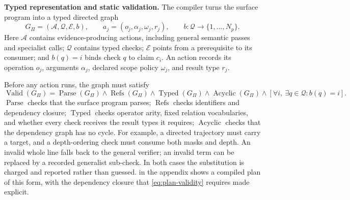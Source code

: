 \medskip\noindent\textbf{Typed representation and static validation.}\quad
\label{sec:plan-lang}%
The compiler turns the surface program into a typed directed graph
\begin{equation}
G_{\Pi}=(\mathcal{A},\mathcal{Q},\mathcal{E},b),
\qquad
a_j=(o_j,\alpha_j,\omega_j,r_j),
\qquad
b:\mathcal{Q}\rightarrow\{1,\ldots,N_p\}.
\label{eq:plan-dag}
\end{equation}
Here $\mathcal{A}$ contains evidence-producing actions, including general
semantic passes and specialist calls; $\mathcal{Q}$ contains typed checks;
$\mathcal{E}$ points from a prerequisite to its consumer; and $b(q)=i$ binds
check $q$ to claim $c_i$. An action records its operation $o_j$, arguments
$\alpha_j$, declared scope policy $\omega_j$, and result type $r_j$.

Before any action runs, the graph must satisfy
\begin{equation}
\operatorname{Valid}(G_{\Pi})
=
\operatorname{Parse}(G_{\Pi})
\land \operatorname{Refs}(G_{\Pi})
\land \operatorname{Typed}(G_{\Pi})
\land \operatorname{Acyclic}(G_{\Pi})
\land
\left[\forall i,\ \exists q\in\mathcal{Q}:b(q)=i\right].
\label{eq:plan-validity}
\end{equation}
$\operatorname{Parse}$ checks that the surface program parses;
$\operatorname{Refs}$ checks identifiers and dependency closure;
$\operatorname{Typed}$ checks operator arity, fixed relation vocabularies, and
whether every check receives the result types it requires;
$\operatorname{Acyclic}$ checks that the dependency graph has no cycle. For example, a
directed trajectory must carry a target, and a depth-ordering check must consume
both masks and depth. An invalid whole line falls back to the general verifier;
an invalid term can be replaced by a recorded generalist sub-check. In both
cases the substitution is charged and reported rather than guessed.
 in the appendix shows a compiled plan of this form, with the dependency
closure that \cref{eq:plan-validity} requires made explicit.

